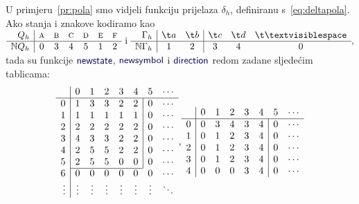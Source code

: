 \begin{primjer}[{name=[kodirana tablica prijelaza]}]\label{pr:polatable}
U primjeru~\ref{pr:pola} smo vidjeli funkciju prijelaza $\delta_h$, definiranu s~\eqref{eq:deltapola}. Ako stanja i znakove kodiramo kao
$
    \begin{array}{r|cccccc}
         Q_h& \textsc a& \textsc b& \textsc c& \textsc d& \textsc e& \textsc f \\\hline
         \N Q_h& 0 & 3 & 4 & 5 & 1 & 2
    \end{array}\text{ i }
    \begin{array}{r|cc|ccc}
        \Gamma_h& \t a & \t b & \t c & \t d & \bl \\\hline
        \N\Gamma_h & 1 & 2 & 3 & 4 & 0
    \end{array}\text,
    $
tada su funkcije $\f{newstate}$, $\f{newsymbol}$ i $\f{direction}$ redom zadane sljedećim tablicama:
\begin{equation*}
\begin{array}{r|ccccccc}
    &0&1&2&3&4&5&\cdots\\\hline
0& 1 & 3 & 3 & 2 & 2 & \multicolumn{1}{|c}{0} & \cdots\\
1& 1 & 1 & 1 & 1 & 1 & \multicolumn{1}{|c}{0} & \cdots\\
2& 2 & 2 & 2 & 2 & 2 & \multicolumn{1}{|c}{0} & \cdots\\
3& 4 & 3 & 3 & 2 & 2 & \multicolumn{1}{|c}{0} & \cdots\\
4& 2 & 5 & 5 & 2 & 2 & \multicolumn{1}{|c}{0} & \cdots\\
5& 2 & 5 & 5 & 0 & 0 & \multicolumn{1}{|c}{0} & \cdots\\ \cline{2-6}
6& 0 & 0 & 0 & 0 & 0 & 0 & \cdots\\
\vdots&\vdots&\vdots&\vdots&\vdots&\vdots&\vdots&\ddots
\end{array}\text,%
\begin{array}{r|ccccccc}
    &0&1&2&3&4&5&\cdots\\\hline
0& 0 & 3 & 4 & 3 & 4 & \multicolumn{1}{|c}{0} & \cdots\\
1& 0 & 1 & 2 & 3 & 4 & \multicolumn{1}{|c}{0} & \cdots\\
2& 0 & 1 & 2 & 3 & 4 & \multicolumn{1}{|c}{0} & \cdots\\
3& 0 & 1 & 2 & 3 & 4 & \multicolumn{1}{|c}{0} & \cdots\\
4& 0 & 0 & 0 & 3 & 4 & \multicolumn{1}{|c}{0} & \cdots\\

\end{array}
\end{equation*}
\end{primjer}
